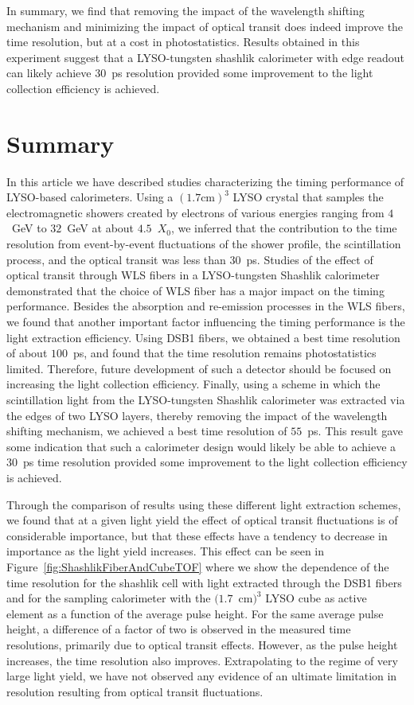 \documentclass[12pt]{article}
\begin{document}
In summary, we find that removing the impact of the wavelength shifting mechanism
and minimizing the impact of optical transit does indeed improve the time
resolution, but at a cost in photostatistics. Results obtained in this
experiment suggest that a LYSO-tungsten shashlik calorimeter with edge
readout can likely achieve $30$~ps resolution provided 
some improvement to the light collection efficiency is achieved.

\section{Summary}

In this article we have described studies characterizing the 
timing performance of LYSO-based calorimeters. 
Using a $(1.7\mathrm{ cm})^{3}$
LYSO crystal that samples the electromagnetic showers created
by electrons of various energies ranging from $4$~GeV to $32$~GeV
at about $4.5$~$X_{0}$, we inferred that the contribution to the 
time resolution from event-by-event fluctuations 
of the shower profile, the scintillation process, and the optical
transit was less than $30$~ps. Studies of the
effect of optical transit through WLS
fibers in a LYSO-tungsten Shashlik calorimeter demonstrated that
the choice of WLS fiber has a major impact on the timing performance.
Besides the absorption and re-emission processes in
the WLS fibers, we found that another important factor influencing
the timing performance is the light extraction efficiency. Using
DSB1 fibers, we obtained a best time resolution of about $100$~ps, 
and found that the time resolution remains photostatistics limited.
Therefore, future development of such a detector should be focused 
on increasing the light collection efficiency. Finally, using a scheme in 
which the scintillation light from the LYSO-tungsten Shashlik calorimeter 
was extracted via the edges of two LYSO layers, thereby removing the impact
of the wavelength shifting mechanism, we achieved a best time  
resolution of $55$~ps. This result gave some indication that such a
calorimeter design would likely be able to achieve a $30$~ps 
time resolution provided some improvement to the 
light collection efficiency is achieved.

Through the comparison of results
using these different light extraction schemes, we found that at a 
given light yield the effect of optical transit fluctuations
is of considerable importance, but that these effects
have a tendency to decrease in importance as the light yield
increases. This effect can be seen in 
Figure~\ref{fig:ShashlikFiberAndCubeTOF} where we show
the dependence of the time resolution for the shashlik cell 
with light extracted through the DSB1 fibers and for the 
sampling calorimeter with the
$(1.7$~cm$)^{3}$ LYSO cube as active element as a function
of the average pulse height. For the same average pulse height,
a difference of a factor of two is observed in the
measured time resolutions, primarily due to
optical transit effects. However, as the pulse height
increases, the time resolution also improves.
Extrapolating to the regime of very large light yield,
we have not observed any evidence of an
ultimate limitation in resolution resulting from
optical transit fluctuations.
\end{document}
